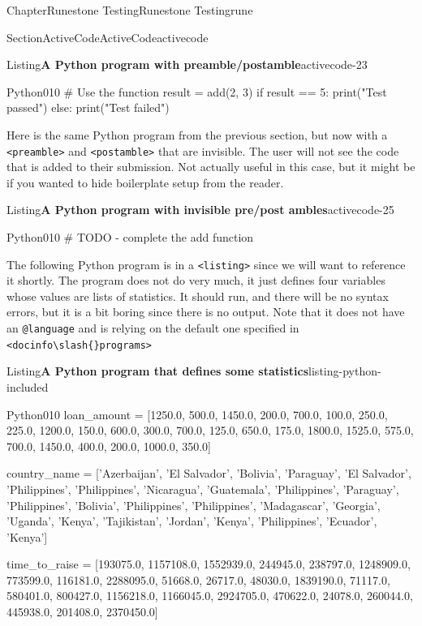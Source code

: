 \documentclass[oneside,10pt,]{book}
\newcommand{\mono}[1]{\texttt{#1}}
\numberwithin{equation}{section}
\begin{document}
\begin{chapterptx}{Chapter}{Runestone Testing}{}{Runestone Testing}{}{}{rune}
\begin{sectionptx}{Section}{ActiveCode}{}{ActiveCode}{}{}{activecode}
\begin{listingptx}{Listing}{\textbf{A Python program with preamble\slash{}postamble}}{activecode-23}{}
\begin{program}{Python}{0}{1}{0}
# Use the function
result = add(2, 3)
if result == 5:
    print("Test passed")
else:
    print("Test failed")
\end{program}
\end{listingptx}%
Here is the same Python program from the previous section, but now with a \mono{<preamble>} and \mono{<postamble>} that are invisible.  The user will not see the code that is added to their submission.  Not actually useful in this case, but it might be if you wanted to hide boilerplate setup from the reader.%
\begin{listingptx}{Listing}{\textbf{A Python program with invisible pre\slash{}post ambles}}{activecode-25}{}%
\begin{program}{Python}{0}{1}{0}
# TODO - complete the add function
\end{program}
\end{listingptx}%
The following Python program is in a \mono{<listing>} since we will want to reference it shortly.  The program does not do very much, it just defines four variables whose values are lists of statistics.  It should run, and there will be no syntax errors, but it is a bit boring since there is no output. Note that it does not have an \mono{@language} and is relying on the default one specified in \mono{<docinfo\textbackslash{}slash\{\}programs>}%
\begin{listingptx}{Listing}{\textbf{A Python program that defines some statistics}}{listing-python-included}{}%
\begin{program}{Python}{0}{1}{0}
loan_amount = [1250.0, 500.0, 1450.0, 200.0, 700.0, 100.0, 250.0, 225.0, 1200.0, 150.0, 600.0, 300.0, 700.0, 125.0, 650.0, 175.0, 1800.0, 1525.0, 575.0, 700.0, 1450.0, 400.0, 200.0, 1000.0, 350.0]

country_name = ['Azerbaijan', 'El Salvador', 'Bolivia', 'Paraguay', 'El Salvador', 'Philippines', 'Philippines', 'Nicaragua', 'Guatemala', 'Philippines', 'Paraguay', 'Philippines', 'Bolivia', 'Philippines', 'Philippines', 'Madagascar', 'Georgia', 'Uganda', 'Kenya', 'Tajikistan', 'Jordan', 'Kenya', 'Philippines', 'Ecuador', 'Kenya']

time_to_raise = [193075.0, 1157108.0, 1552939.0, 244945.0, 238797.0, 1248909.0, 773599.0, 116181.0, 2288095.0, 51668.0, 26717.0, 48030.0, 1839190.0, 71117.0, 580401.0, 800427.0, 1156218.0, 1166045.0, 2924705.0, 470622.0, 24078.0, 260044.0, 445938.0, 201408.0, 2370450.0]


\end{program}
\end{listingptx}
\end{sectionptx}
\end{chapterptx}
\end{document}
